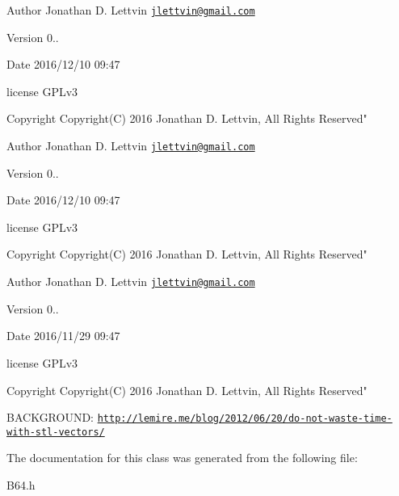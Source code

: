 \begin{DoxyAuthor}{Author}
Jonathan D. Lettvin \href{mailto:jlettvin@gmail.com}{\tt jlettvin@gmail.\+com}
\end{DoxyAuthor}
\begin{DoxyVersion}{Version}
0..
\end{DoxyVersion}
\begin{DoxyDate}{Date}
2016/12/10 09\+:47
\end{DoxyDate}
license G\+P\+Lv3

\begin{DoxyCopyright}{Copyright}
Copyright(\+C) 2016 Jonathan D. Lettvin, All Rights Reserved"
\end{DoxyCopyright}
\begin{DoxyAuthor}{Author}
Jonathan D. Lettvin \href{mailto:jlettvin@gmail.com}{\tt jlettvin@gmail.\+com}
\end{DoxyAuthor}
\begin{DoxyVersion}{Version}
0..
\end{DoxyVersion}
\begin{DoxyDate}{Date}
2016/12/10 09\+:47
\end{DoxyDate}
license G\+P\+Lv3

\begin{DoxyCopyright}{Copyright}
Copyright(\+C) 2016 Jonathan D. Lettvin, All Rights Reserved"
\end{DoxyCopyright}
\begin{DoxyAuthor}{Author}
Jonathan D. Lettvin \href{mailto:jlettvin@gmail.com}{\tt jlettvin@gmail.\+com}
\end{DoxyAuthor}
\begin{DoxyVersion}{Version}
0..
\end{DoxyVersion}
\begin{DoxyDate}{Date}
2016/11/29 09\+:47
\end{DoxyDate}
license G\+P\+Lv3

\begin{DoxyCopyright}{Copyright}
Copyright(\+C) 2016 Jonathan D. Lettvin, All Rights Reserved"
\end{DoxyCopyright}
B\+A\+C\+K\+G\+R\+O\+U\+ND\+: \href{http://lemire.me/blog/2012/06/20/do-not-waste-time-with-stl-vectors/}{\tt http\+://lemire.\+me/blog/2012/06/20/do-\/not-\/waste-\/time-\/with-\/stl-\/vectors/} 

The documentation for this class was generated from the following file\+:\begin{DoxyCompactItemize}
\item 
B64.\+h\end{DoxyCompactItemize}
